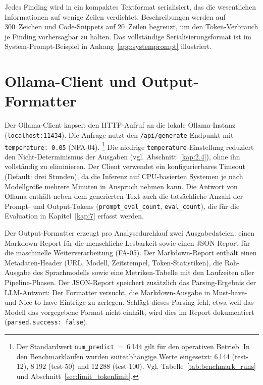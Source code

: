 Jedes Finding wird in ein kompaktes Textformat serialisiert, das die wesentlichen Informationen auf wenige Zeilen verdichtet. Beschreibungen werden auf 300~Zeichen und Code-Snippets auf 20~Zeilen begrenzt, um den Token-Verbrauch je Finding vorhersagbar zu halten. Das vollständige Serialisierungsformat ist im System-Prompt-Beispiel in 
Anhang~\ref{app:systemprompt} illustriert.

\section{Ollama-Client und Output-Formatter}
\label{sec:impl-ollama}
\label{sec:impl-output}

Der Ollama-Client kapselt den \acs{HTTP}-Aufruf an die lokale Ollama-Instanz (\texttt{localhost:11434}). Die Anfrage nutzt den \texttt{/api/generate}-Endpunkt mit \texttt{temperature:~0.05} (\ac{NFA}-04).%
\footnote{Der Standardwert \texttt{num\_predict}~=~6\,144 gilt für den operativen Betrieb. In den Benchmarkläufen wurden suiteabhängige Werte eingesetzt: 6\,144 (test-12), 8\,192 (test-50) und 12\,288 (test-100). Vgl. Tabelle~\ref{tab:benchmark_runs} und Abschnitt~\ref{sec:limit_tokenlimit}.}
Die niedrige \texttt{temperature}-Einstellung reduziert den Nicht-Determinismus der Ausgaben (vgl. Abschnitt~\ref{kap:2.4}), ohne ihn vollständig zu eliminieren. Der Client verwendet ein konfigurierbares Time\-out (Default: drei Stunden), da die Inferenz auf \ac{CPU}-basierten Systemen je nach Modellgröße mehrere Minuten in Anspruch nehmen kann. Die Antwort von Ollama enthält neben dem generierten Text auch die tatsächliche Anzahl der Prompt- und Output-Tokens (\texttt{prompt\_eval\_count}, \texttt{eval\_count}), die für die Evaluation in Kapitel~\ref{kap:7} erfasst werden.

Der Output-Formatter erzeugt pro Analysedurchlauf zwei Ausgabedateien: einen Markdown-Report für die menschliche Lesbarkeit sowie einen \acs{JSON}-Report für die maschinelle Weiterverarbeitung (\ac{FA}-05). Der Markdown-Report enthält einen Metadaten-Header (\acs{URL}, Modell, Zeitstempel, Token-Statistiken), die Roh-Ausgabe des Sprachmodells sowie eine Metriken-Tabelle mit den Laufzeiten aller Pipeline-Phasen. Der \acs{JSON}-Report speichert zusätzlich das Parsing-Ergebnis der \ac{LLM}-Antwort: Der Formatter versucht, die Markdown-Ausgabe in Must-have- und Nice-to-have-Einträge zu zerlegen. Schlägt dieses Parsing fehl, etwa weil das Modell das vorgegebene Format nicht einhält, wird dies im Report dokumentiert (\texttt{parsed.success: false}).

